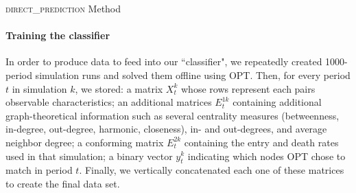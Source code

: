 \begin{algorithm}[htbp]
	\SetAlgoLined
  \DontPrintSemicolon
	

	\caption{\textsc{direct\_prediction} Method}
	\label{alg:direct_prediction}
\end{algorithm}

\paragraph{Training the classifier} In order to produce data to feed into our ``classifier", we repeatedly created 1000-period simulation runs and solved them offline using \textsc{OPT}. Then, for every period $t$ in simulation $k$, we stored: a matrix $X_t^{k}$ whose rows represent each pairs observable characteristics; an additional matrices $E_{t}^{1k}$ containing additional graph-theoretical information such as several centrality measures (betweenness, in-degree, out-degree, harmonic, closeness), in- and out-degrees, and average neighbor degree; a conforming matrix $E_{t}^{2k}$ containing the entry and death rates used in that simulation; a binary vector $y_t^{k}$ indicating which nodes \textsc{OPT} chose to match in period $t$. Finally, we vertically concatenated each one of these matrices to create the final data set.

